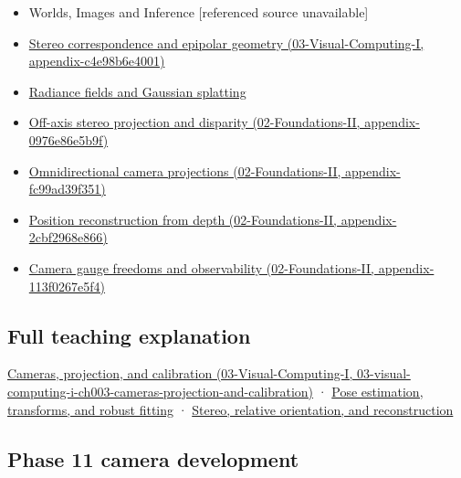 \begin{itemize}
\item
  {Worlds, Images and Inference {[}referenced source unavailable{]}}
\item
  \href{../03-Visual-Computing-I/main.pdf\#nameddest=appendix-c4e98b6e4001}{Stereo correspondence and epipolar geometry (03-Visual-Computing-I, appendix-c4e98b6e4001)}
\item
  \hyperref[appendix-c5b332e400e7]{Radiance fields and Gaussian splatting}
\item
  \href{../02-Foundations-II/main.pdf\#nameddest=appendix-0976e86e5b9f}{Off-axis stereo projection and disparity (02-Foundations-II, appendix-0976e86e5b9f)}
\item
  \href{../02-Foundations-II/main.pdf\#nameddest=appendix-fc99ad39f351}{Omnidirectional camera projections (02-Foundations-II, appendix-fc99ad39f351)}
\item
  \href{../02-Foundations-II/main.pdf\#nameddest=appendix-2cbf2968e866}{Position reconstruction from depth (02-Foundations-II, appendix-2cbf2968e866)}
\item
  \href{../02-Foundations-II/main.pdf\#nameddest=appendix-113f0267e5f4}{Camera gauge freedoms and observability (02-Foundations-II, appendix-113f0267e5f4)}
\end{itemize}

\subsection{Full teaching explanation}\label{appendix-3ee9861904d5-full-teaching-explanation}

\href{../03-Visual-Computing-I/main.pdf\#nameddest=03-visual-computing-i-ch003-cameras-projection-and-calibration}{Cameras, projection, and calibration (03-Visual-Computing-I, 03-visual-computing-i-ch003-cameras-projection-and-calibration)} · \hyperref[04-visual-computing-ii-ch032-pose-estimation-transforms-and-robust-fitting]{Pose estimation, transforms, and robust fitting} · \hyperref[04-visual-computing-ii-ch032-stereo-relative-orientation-and-reconstruction]{Stereo, relative orientation, and reconstruction}

\subsection{Phase 11 camera development}\label{appendix-3ee9861904d5-phase-11-camera-development}

